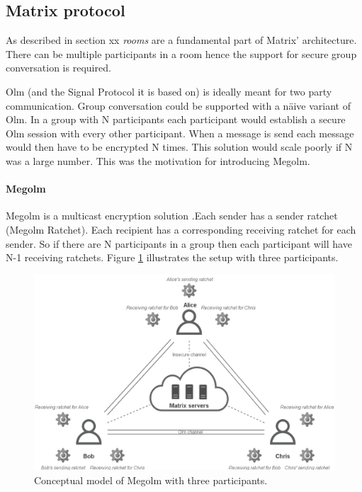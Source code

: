 \subsection{Matrix protocol}

As described in section xx \emph{rooms} are a fundamental part of Matrix' architecture. There can be multiple participants in a room hence the support for secure group conversation is required.

Olm (and the Signal Protocol it is based on) is ideally meant for two party communication.
Group conversation could be supported with a näive variant of Olm. In a group with N participants each participant would establish a secure Olm session with every other participant. When a message is send each message would then have to be encrypted N times. This solution would scale poorly if N was a large number. This was the motivation for introducing Megolm.

\paragraph{Megolm}

Megolm is a multicast encryption solution \cite{sok}.Each sender has a sender ratchet (Megolm Ratchet). Each recipient has a corresponding receiving ratchet for each sender. So if there are N participants in a group then each participant will have N-1 receiving ratchets. Figure \ref{fig:megolm} illustrates the setup with three participants. 

\begin{figure}[H]
	\hspace*{-1cm} 
	\centering
	\includegraphics[width=14cm]{figures/megolm_conceptual.png}
	\caption{Conceptual model of Megolm with three participants.}
	\label{fig:megolm}
\end{figure}

